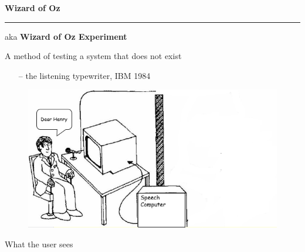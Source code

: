 \documentclass[pdf]{beamer}
\begin{document}
\begin{frame}
\vspace{8mm}
\textcolor{myBlue}{\textbf{\Large{Wizard of Oz}}}

\textcolor{red}{\rule{10cm}{1mm}}

aka \textbf{Wizard of Oz Experiment}

A method of testing a system that does not exist

\begin{itemize}
      \item[\textcolor{black}{--}] the listening typewriter, IBM 1984      
      
  \end{itemize}
  \begin{figure}[b]
    	\includegraphics[scale = 0.5]{37_1.png}
    \end{figure}
    What the user sees
    
\end{frame}
\end{document}
